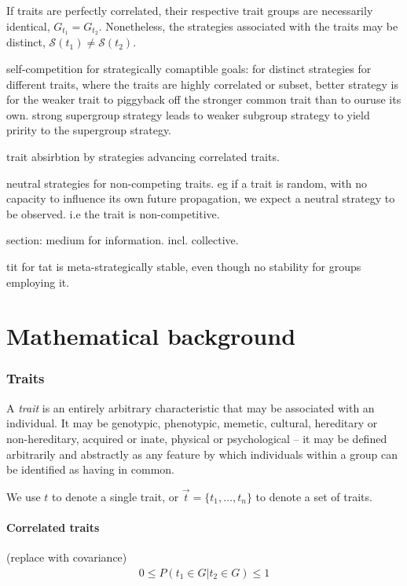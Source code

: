 \documentclass[twocolumn, aps, rmp, amsmath, amssymb, nofootinbib, superscriptaddress, longbibliography, floatfix, table-of-contents, eqsecnum]{revtex4-1}
\begin{document}
If traits are perfectly correlated, their respective trait groups are necessarily identical, $G_{t_1}=G_{t_2}$. Nonetheless, the strategies associated with the traits may be distinct, $\mathcal{S}(t_1)\neq\mathcal{S}(t_2)$.

self-competition for strategically comaptible goals:
for distinct strategies for different traits, where the traits are highly correlated or subset, better strategy is for the weaker trait to piggyback off the stronger common trait than to ouruse its own. strong supergroup strategy leads to weaker subgroup strategy to yield pririty to the supergroup strategy.

trait absirbtion by strategies advancing correlated traits. 

neutral strategies for non-competing traits. eg if a trait is random, with no capacity to influence its own future propagation, we expect a neutral strategy to be observed. i.e the trait is non-competitive.

section: medium for information. incl. collective.

tit for tat is meta-strategically stable, even though no stability for groups employing it.

%
%

\part{Mathematical background}

\section{Traits}

A \textit{trait} is an entirely arbitrary characteristic that may be associated with an individual. It may be genotypic, phenotypic, memetic, cultural, hereditary or non-hereditary, acquired or inate, physical or psychological -- it may be defined arbitrarily and abstractly as any feature by which individuals within a group can be identified as having in common.

We use $t$ to denote a single trait, or $\vec t=\{t_1,\dots,t_n\}$ to denote a set of traits.

\subsection{Correlated traits}

(replace with covariance)
\begin{align}
0\leq P(t_1\in G | t_2\in G)\leq 1	
\end{align}
\end{document}
